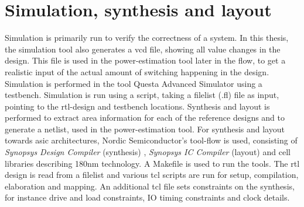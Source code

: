 \section{Simulation, synthesis and layout}
Simulation is primarily run to verify the correctness of a system. In this thesis, the simulation tool also generates a \gls{vcd} file, showing all value changes in the design. This file is used in the power-estimation tool later in the flow, to get a realistic input of the actual amount of switching happening in the design. Simulation is performed in the tool Questa Advanced Simulator \cite{questasim} using a testbench. Simulation is run using a script, taking a filelist (.fl) file as input, pointing to the \gls{rtl}-design and testbench locations. Synthesis and layout is performed to extract area information for each of the reference designs and to generate a netlist, used in the power-estimation tool. For synthesis and layout towards \gls{asic} architectures, Nordic Semiconductor's tool-flow is used, consisting of \textit{Synopsys Design Compiler} (synthesis) \cite{syndescomp}, \textit{Synopsys IC Compiler} (layout) \cite{syniccomp} and cell libraries describing 180nm technology. A Makefile is used to run the tools. The \gls{rtl} design is read from a filelist and various \gls{tcl} scripts are run for setup, compilation, elaboration and mapping. An additional \gls{tcl} file sets constraints on the synthesis, for instance drive and load constraints, IO timing constraints and clock details.
